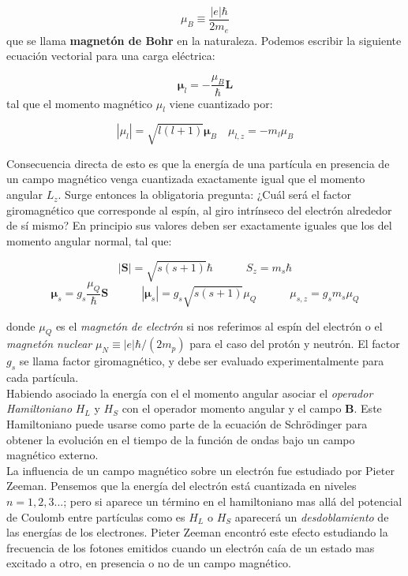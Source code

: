 \documentclass[12pt]{article}
\newcommand{\tquad}{\quad \quad \quad}
\newcommand{\Sn}{\mathbf{S}}
\newcommand{\Ln}{\mathbf{L}}
\newcommand{\nmu}{\boldsymbol{\mu}}
\newcommand{\Bn}{\mathbf{B}}
\begin{document}
\begin{equation}
\mu_B \equiv \dfrac{|e| \hbar}{2 m_e}
\end{equation}
que se llama \textbf{magnetón de Bohr} en la naturaleza. Podemos escribir la siguiente ecuación vectorial para una carga eléctrica:

\begin{equation}
\nmu_l = - \dfrac{\mu_B}{\hbar} \Ln
\end{equation}
tal que el momento magnético $\mu_l$ viene cuantizado por:

\begin{equation}
| \mu_l | = \sqrt{l (l+1)} \nmu_B \quad \mu_{l,z} = - m_l \mu_B
\end{equation}

Consecuencia directa de esto es que la energía de una partícula en presencia de un campo magnético venga cuantizada exactamente igual que el momento angular $L_z$. Surge entonces la obligatoria pregunta: ¿Cuál será el factor giromagnético que corresponde al espín, al giro intrínseco del electrón alrededor de sí mismo? En principio sus valores deben ser exactamente iguales que los del momento angular normal, tal que:

\begin{equation}
|\Sn| = \sqrt{s(s+1)} \hbar \tquad S_z = m_s \hbar 
\end{equation}
\begin{equation}
\nmu_s = g_s \dfrac{\mu_Q}{\hbar} \Sn  \tquad | \nmu_s | = g_s \sqrt{s(s+1)} \mu_Q \tquad \mu_{s,z} = g_s m_s \mu_Q
\end{equation}

donde $\mu_Q$ es el \textit{magnetón de electrón} si nos referimos al espín del electrón o el \textit{magnetón nuclear} $\mu_N \equiv |e| \hbar / (2 m_p)$  para el caso del protón y neutrón. El factor $g_s$ se llama factor giromagnético, y debe ser evaluado experimentalmente para cada partícula. \\

Habiendo asociado la energía con el el momento angular asociar el \textit{operador Hamiltoniano} $H_L$ y $H_S$ con el operador momento angular y el campo $\Bn$. Este Hamiltoniano puede usarse como parte de la ecuación de Schrödinger para obtener la evolución en el tiempo de la función de ondas bajo un campo magnético externo. \\

La influencia de un campo magnético sobre un electrón fue estudiado por Pieter Zeeman. Pensemos que la energía del electrón está cuantizada en niveles $n=1,2,3...$; pero si aparece un término en el hamiltoniano mas allá del potencial de Coulomb entre partículas como es $H_L$ o $H_S$ aparecerá un \textit{desdoblamiento} de las energías de los electrones. Pieter Zeeman encontró este efecto estudiando la frecuencia de los fotones emitidos cuando un electrón caía de un estado mas excitado a otro, en presencia o no de un campo magnético. 
\end{document}
